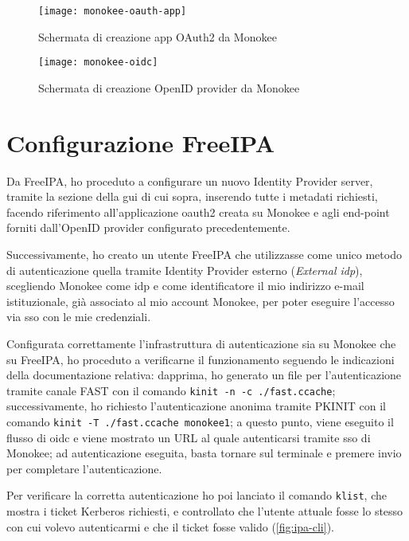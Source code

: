 \begin{figure}[H] 
    \centering 
    \texttt{[image: monokee-oauth-app]} 
    \caption{Schermata di creazione app OAuth2 da Monokee}
    \label{fig:monokee-oauth}
\end{figure}

\begin{figure}[H] 
    \centering 
    \texttt{[image: monokee-oidc]} 
    \caption{Schermata di creazione OpenID provider da Monokee}
    \label{fig:monokee-oidc}
\end{figure}

\section{Configurazione FreeIPA}
Da FreeIPA, ho proceduto a configurare un nuovo Identity Provider server, tramite la sezione della \acrfull{gui} di cui sopra, inserendo tutte i metadati richiesti, facendo riferimento all'applicazione \acrshort{oauth2} creata su Monokee e agli end-point forniti dall'OpenID provider configurato precedentemente.

Successivamente, ho creato un utente FreeIPA che utilizzasse come unico metodo di autenticazione quella tramite Identity Provider esterno (\emph{External \acrshort{idp}}), scegliendo Monokee come \acrshort{idp} e come identificatore il mio indirizzo e-mail istituzionale, già associato al mio account Monokee, per poter eseguire l'accesso via \acrshort{sso} con le mie credenziali\cite{site:using-ext-idp-idm}.  

Configurata correttamente l'infrastruttura di autenticazione sia su Monokee che su FreeIPA, ho proceduto a verificarne il funzionamento seguendo le indicazioni della documentazione relativa: dapprima, ho generato un file per l'autenticazione tramite canale FAST con il comando \texttt{kinit -n -c ./fast.ccache}; successivamente, ho richiesto l'autenticazione anonima tramite PKINIT con il comando \texttt{kinit -T ./fast.ccache monokee1}; a questo punto, viene eseguito il flusso di \acrshort{oidc} e viene mostrato un URL al quale autenticarsi tramite \acrshort{sso} di Monokee; ad autenticazione eseguita, basta tornare sul terminale e premere invio per completare l'autenticazione.

Per verificare la corretta autenticazione ho poi lanciato il comando \texttt{klist}, che mostra i ticket Kerberos richiesti, e controllato che l'utente attuale fosse lo stesso con cui volevo autenticarmi e che il ticket fosse valido (\autoref{fig:ipa-cli}).  

